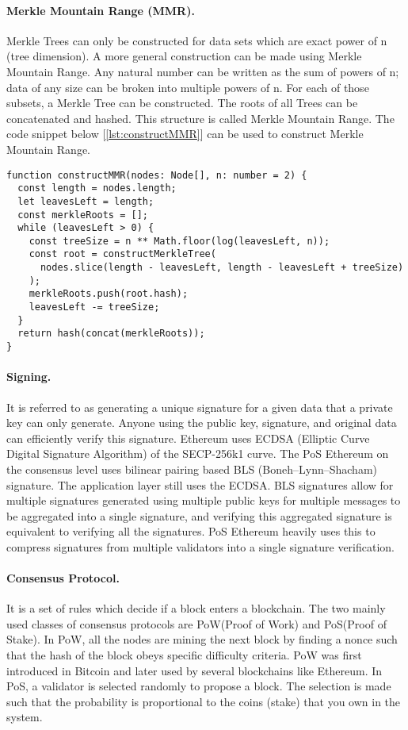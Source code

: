 \documentclass[a4paper,11pt,oneside]{article}
\theoremstyle{definition}
\begin{document}
   \paragraph{Merkle Mountain Range (MMR).} Merkle Trees can only be constructed for data sets which are exact power of n (tree dimension). A more general construction can be made using Merkle Mountain Range. Any natural number can be written as the sum of powers of n; data of any size can be broken into multiple powers of n. For each of those subsets, a Merkle Tree can be constructed. The roots of all Trees can be concatenated and hashed. This structure is called Merkle Mountain Range\cite{opentimestampMMR, grinMMR}. The code snippet below [\ref{lst:constructMMR}] can be used to construct Merkle Mountain Range.
\begin{lstlisting}[label = {lst:constructMMR}]
function constructMMR(nodes: Node[], n: number = 2) {
  const length = nodes.length;
  let leavesLeft = length;
  const merkleRoots = [];
  while (leavesLeft > 0) {
    const treeSize = n ** Math.floor(log(leavesLeft, n));
    const root = constructMerkleTree(
      nodes.slice(length - leavesLeft, length - leavesLeft + treeSize)
    );
    merkleRoots.push(root.hash);
    leavesLeft -= treeSize;
  }
  return hash(concat(merkleRoots));
}
\end{lstlisting}
  
  \paragraph{Signing.} It is referred to as generating a unique signature for a given data that a private key can only generate. Anyone using the public key, signature, and original data can efficiently verify this signature. Ethereum uses ECDSA (Elliptic Curve Digital Signature Algorithm)\cite{ECDSA} of the SECP-256k1 curve\cite{Ethereum, EthereumYellowPaper}. The PoS Ethereum on the consensus level uses bilinear pairing based BLS (Boneh–Lynn–Shacham) signature\cite{10.1007/978-3-030-03329-3_15}. The application layer still uses the ECDSA. BLS signatures allow for multiple signatures generated using multiple public keys for multiple messages to be aggregated into a single signature, and verifying this aggregated signature is equivalent to verifying all the signatures\cite{BLSAggregate, 10.1007/978-3-030-03329-3_15}. PoS Ethereum heavily uses this to compress signatures from multiple validators into a single signature verification. 
  
  \paragraph{Consensus Protocol.} It is a set of rules which decide if a block enters a blockchain. The two mainly used classes of consensus protocols are PoW(Proof of Work) and PoS(Proof of Stake). In PoW, all the nodes are mining the next block by finding a nonce such that the hash of the block obeys specific difficulty criteria. PoW was first introduced in Bitcoin and later used by several blockchains like Ethereum\cite{Bitcoin, Ethereum}. In PoS, a validator is selected randomly to propose a block. The selection is made such that the probability is proportional to the coins (stake) that you own in the system.  
  
\end{document}
